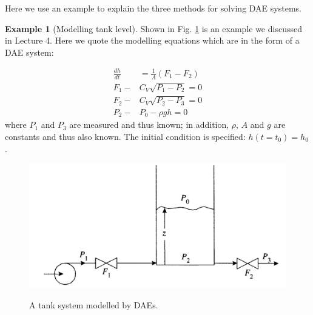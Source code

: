\documentclass[a4paper,11pt]{article}
\theoremstyle{definition}
\newtheorem{exmp}{Example}[section]
\begin{document}
Here we use an example to explain the three methods for solving DAE systems.

\begin{exmp}[Modelling tank level]
Shown in Fig. \ref{fig:tank} is an example we discussed in Lecture 4. Here
we quote the modelling equations which are in the form of a DAE system:

\begin{align}
	\frac{d h}{d t} &= \frac{1}{A} ( F_1 - F_2 ) \label{eq:tank1} \\
	F_1 - & C_V \sqrt{P_1 - P_2} = 0 \label{eq:tank2} \\
	F_2 - & C_V \sqrt{P_2 - P_3} = 0 \label{eq:tank3} \\
	P_2 - & P_0 - \rho g h = 0 \label{eq:tank4}
\end{align}
\noindent where $P_1$ and $P_3$ are measured and thus known;
in addition, $\rho$, $A$ and $g$ are constants and thus also known.
The initial condition is specified: $h(t=t_0) = h_0$.

\begin{figure} [!h]
 \begin{center}
	\includegraphics[width=.6\textwidth]{tank}\\
 \end{center}
 \caption{A tank system modelled by DAEs.} 
 \label{fig:tank}
\end{figure}


\end{exmp}
\end{document}
